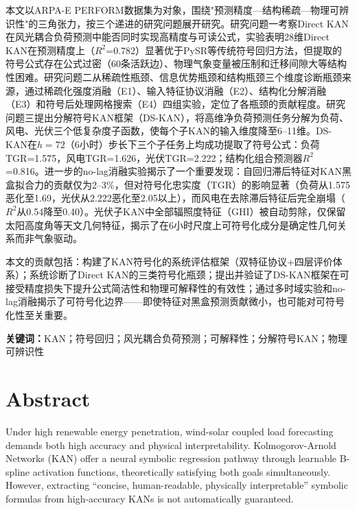 \documentclass[12pt,a4paper,oneside]{ctexbook}
\begin{document}
本文以ARPA-E PERFORM数据集为对象，围绕"预测精度—结构稀疏—物理可辨识性"的三角张力，按三个递进的研究问题展开研究。研究问题一考察Direct KAN在风光耦合负荷预测中能否同时实现高精度与可读公式，实验表明28维Direct KAN在预测精度上（$R^2$=0.782）显著优于PySR等传统符号回归方法，但提取的符号公式存在公式过密（60条活跃边）、物理气象变量被压制和迁移间隙大等结构性困难。研究问题二从稀疏性瓶颈、信息优势瓶颈和结构瓶颈三个维度诊断瓶颈来源，通过稀疏化强度消融（E1）、输入特征协议消融（E2）、结构化分解消融（E3）和符号后处理网格搜索（E4）四组实验，定位了各瓶颈的贡献程度。研究问题三提出分解符号KAN框架（DS-KAN），将高维净负荷预测任务分解为负荷、风电、光伏三个低复杂度子函数，使每个子KAN的输入维度降至6--11维。DS-KAN在$h=72$（6小时）步长下三个子任务上均成功提取了符号公式：负荷TGR=1.575，风电TGR=1.626，光伏TGR=2.222；结构化组合预测器$R^2$=0.816。进一步的no-lag消融实验揭示了一个重要发现：自回归滞后特征对KAN黑盒拟合力的贡献仅为2--3\%，但对符号化忠实度（TGR）的影响显著（负荷从1.575恶化至1.69，光伏从2.222恶化至2.05以上），而风电在去除滞后特征后完全崩塌（$R^2$从0.54降至0.40）。光伏子KAN中全部辐照度特征（GHI）被自动剪除，仅保留太阳高度角等天文几何特征，揭示了在6小时尺度上可符号化成分是确定性几何关系而非气象驱动。

本文的贡献包括：构建了KAN符号化的系统评估框架（双特征协议+四层评价体系）；系统诊断了Direct KAN的三类符号化瓶颈；提出并验证了DS-KAN框架在可接受精度损失下提升公式简洁性和物理可解释性的有效性；通过多时域实验和no-lag消融揭示了可符号化边界——即使特征对黑盒预测贡献微小，也可能对可符号化性至关重要。

\vspace{1em}
\noindent\textbf{关键词：}KAN；符号回归；风光耦合负荷预测；可解释性；分解符号KAN；物理可辨识性

\newpage

\chapter*{Abstract}

Under high renewable energy penetration, wind-solar coupled load forecasting demands both high accuracy and physical interpretability. Kolmogorov-Arnold Networks (KAN) offer a neural symbolic regression pathway through learnable B-spline activation functions, theoretically satisfying both goals simultaneously. However, extracting ``concise, human-readable, physically interpretable'' symbolic formulas from high-accuracy KANs is not automatically guaranteed.
\end{document}
